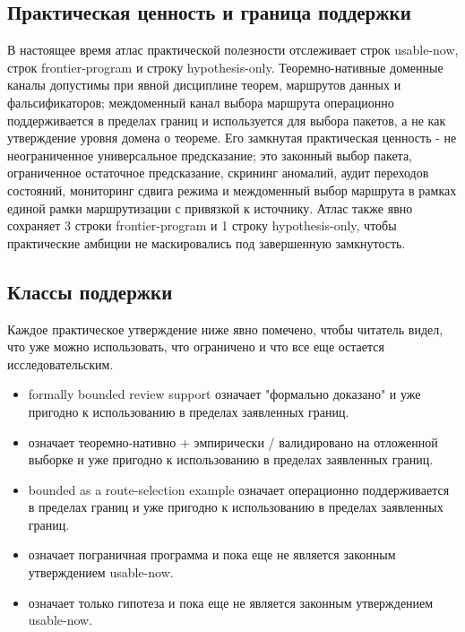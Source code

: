 \subsection{Практическая ценность и граница поддержки}
В настоящее время атлас практической полезности отслеживает  строк usable-now,  строк frontier-program и  строку hypothesis-only.
Теоремно-нативные доменные каналы допустимы при явной дисциплине теорем, маршрутов данных и фальсификаторов; междоменный канал выбора маршрута операционно поддерживается в пределах границ и используется для выбора пакетов, а не как утверждение уровня домена о теореме.
Его замкнутая практическая ценность - не неограниченное универсальное предсказание; это законный выбор пакета, ограниченное остаточное предсказание, скрининг аномалий, аудит переходов состояний, мониторинг сдвига режима и междоменный выбор маршрута в рамках единой рамки маршрутизации с привязкой к источнику.
Атлас также явно сохраняет 3 строки frontier-program и 1 строку hypothesis-only, чтобы практические амбиции не маскировались под завершенную замкнутость.

\subsection{Классы поддержки}
Каждое практическое утверждение ниже явно помечено, чтобы читатель видел, что уже можно использовать, что ограничено и что все еще остается исследовательским.
\begin{itemize}[leftmargin=1.6em,nosep]
\item formally bounded review support означает "формально доказано" и уже пригодно к использованию в пределах заявленных границ.
\item {} означает теоремно-нативно + эмпирически / валидировано на отложенной выборке и уже пригодно к использованию в пределах заявленных границ.
\item bounded as a route-selection example означает операционно поддерживается в пределах границ и уже пригодно к использованию в пределах заявленных границ.
\item {} означает пограничная программа и пока еще не является законным утверждением usable-now.
\item {} означает только гипотеза и пока еще не является законным утверждением usable-now.
\end{itemize}

